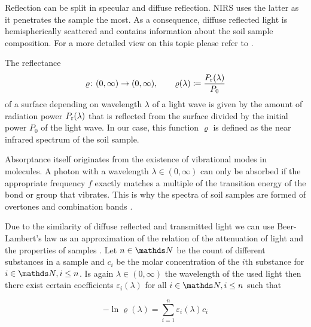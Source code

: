 		Reflection can be split in specular and diffuse reflection.
		NIRS uses the latter as it penetrates the sample the most.
		As a consequence, diffuse reflected light is hemispherically scattered and contains information about the soil sample composition.
		For a more detailed view on this topic please refer to \cite[248-251]{agelet:10a}.

		The reflectance 
		\[
			\varrho\colon(0,\infty)\to(0,\infty),\qquad \varrho(\lambda) \coloneqq \frac{P_{\mathrm{r}}(\lambda)}{P_0}
		\]
		of a surface depending on wavelength $\lambda$ of a light wave is given by the amount of radiation power $P_{\mathrm{r}}(\lambda)$ that is reflected from the surface divided by the initial power $P_0$ of the light wave.	
		In our case, this function $\varrho$ is defined as the near infrared spectrum of the soil sample.

		Absorptance itself originates from the existence of vibrational modes in molecules.
		A photon with a wavelength $\lambda \in (0,\infty)$ can only be absorbed if the appropriate frequency $f$ exactly matches a multiple of the transition energy of the bond or group that vibrates.
		This is why the spectra of soil samples are formed of overtones and combination bands \cite[247]{agelet:10a}.

		Due to the similarity of diffuse reflected and transmitted light we can use Beer-Lambert's law as an approximation of the relation of the attenuation of light and the properties of samples \cite[247-8]{agelet:10a}.
		Let $n\in\SN$ be the count of different substances in a sample and $c_i$ be the molar concentration of the $i$th substance for $i\in\SN,i\leq n$.
		Is again $\lambda \in (0,\infty)$ the wavelength of the used light then there exist certain coefficients $\varepsilon_i(\lambda)$ for all $i\in\SN,i\leq n$ such that

		\[
			-\ln \varrho(\lambda) = \sum_{i=1}^{n} \varepsilon_i(\lambda) c_i
		\]


